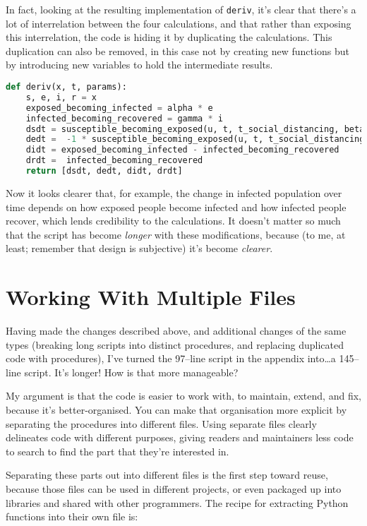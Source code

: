 \documentclass[a4paper]{article}
\begin{document}
In fact, looking at the resulting implementation of \texttt{deriv}, it's clear that there's a lot of interrelation between the four calculations, and that rather than exposing this interrelation, the code is hiding it by duplicating the calculations. This duplication can also be removed, in this case not by creating new functions but by introducing new variables to hold the intermediate results.

\begin{lstlisting}[language=Python]
def deriv(x, t, params):
    s, e, i, r = x
    exposed_becoming_infected = alpha * e
    infected_becoming_recovered = gamma * i
    dsdt = susceptible_becoming_exposed(u, t, t_social_distancing, beta, s, i)
    dedt =  -1 * susceptible_becoming_exposed(u, t, t_social_distancing, beta, s, i) - exposed_becoming_infected
    didt = exposed_becoming_infected - infected_becoming_recovered
    drdt =  infected_becoming_recovered
    return [dsdt, dedt, didt, drdt]
\end{lstlisting}

Now it looks clearer that, for example, the change in infected population over time depends on how exposed people become infected and how infected people recover, which lends credibility to the calculations. It doesn't matter so much that the script has become \emph{longer} with these modifications, because (to me, at least; remember that design is subjective) it's become \emph{clearer}.

\section{Working With Multiple Files}
Having made the changes described above, and additional changes of the same types (breaking long scripts into distinct procedures, and replacing duplicated code with procedures), I've turned the 97--line script in the appendix into\ldots a 145--line script. It's longer! How is that more manageable?

My argument is that the code is easier to work with, to maintain, extend, and fix, because it's better-organised. You can make that organisation more explicit by separating the procedures into different files. Using separate files clearly delineates code with different purposes, giving readers and maintainers less code to search to find the part that they're interested in.

Separating these parts out into different files is the first step toward reuse, because those files can be used in different projects, or even packaged up into libraries and shared with other programmers. The recipe for extracting Python functions into their own file is:
\end{document}
